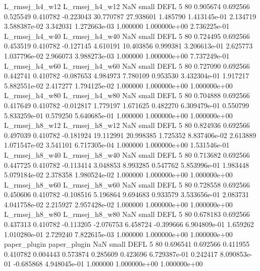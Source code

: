 L_rmsej_h4_w12 L_rmsej_h4_w12                   NaN      small     DEFL                 5 80 0.905674       0.692566 0.525549       0.410782   -0.223043     30.770787     27.938601     1.485790   1.413145e-01  2.134719 3.588387e-02     3.342031   1.272663e-03            1.000000    1.000000e+00        2.736225e-01
L_rmsej_h4_w40 L_rmsej_h4_w40                   NaN      small     DEFL                 5 80 0.724495       0.692566 0.453519       0.410782   -0.127145      4.610191     10.403856     0.999381   3.206613e-01  2.625773 1.037796e-02     2.966073   3.988273e-03            1.000000    1.000000e+00        7.737249e-01
L_rmsej_h4_w60 L_rmsej_h4_w60                   NaN      small     DEFL                 5 80 0.727090       0.692566 0.442741       0.410782   -0.087653      4.984973      7.780109     0.953530   3.432304e-01  1.917217 5.882551e-02     2.417277   1.794125e-02            1.000000    1.000000e+00        1.000000e+00
L_rmsej_h4_w80 L_rmsej_h4_w80                   NaN      small     DEFL                 5 80 0.704888       0.692566 0.417649       0.410782   -0.012817      1.779197      1.671625     0.482270   6.309479e-01  0.550799 5.833259e-01     0.579250   5.640685e-01            1.000000    1.000000e+00        1.000000e+00
L_rmsej_h8_w12 L_rmsej_h8_w12                   NaN      small     DEFL                 5 80 0.824936       0.692566 0.497039       0.410782   -0.181924     19.112991     20.998385     1.725352   8.837406e-02  2.613889 1.071547e-02     3.541101   6.717305e-04            1.000000    1.000000e+00        1.531546e-01
L_rmsej_h8_w40 L_rmsej_h8_w40                   NaN      small     DEFL                 5 80 0.713682       0.692566 0.447725       0.410782   -0.113414      3.048853      8.993285     0.547762   5.853996e-01  1.983448 5.079184e-02     2.378358   1.980524e-02            1.000000    1.000000e+00        1.000000e+00
L_rmsej_h8_w60 L_rmsej_h8_w60                   NaN      small     DEFL                 5 80 0.728558       0.692566 0.450606       0.410782   -0.108516      5.196864      9.694683     0.933579   3.533656e-01  2.083731 4.041758e-02     2.215927   2.957428e-02            1.000000    1.000000e+00        1.000000e+00
L_rmsej_h8_w80 L_rmsej_h8_w80                   NaN      small     DEFL                 5 80 0.678183       0.692566 0.437313       0.410782   -0.113205     -2.076753      6.458724    -0.399666   6.904809e-01  1.659262 1.010280e-01     2.729240   7.822615e-03            1.000000    1.000000e+00        1.000000e+00
  paper_plugin   paper_plugin                   NaN      small     DEFL                 5 80 0.696541       0.692566 0.411955       0.410782    0.004443      0.573874      0.285609     0.423696   6.729387e-01  0.242417 8.090853e-01    -0.685868   4.948045e-01            1.000000    1.000000e+00        1.000000e+00
